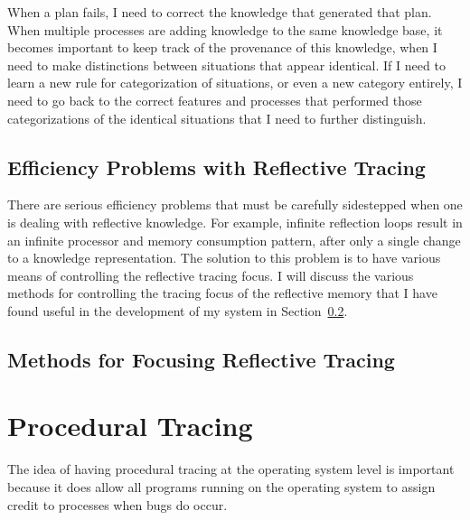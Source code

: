 When a plan fails, I need to correct the knowledge that generated that
plan.  When multiple processes are adding knowledge to the same
knowledge base, it becomes important to keep track of the provenance of
this knowledge, when I need to make distinctions between situations
that appear identical.  If I need to learn a new rule for
categorization of situations, or even a new category entirely, I need
to go back to the correct features and processes that performed those
categorizations of the identical situations that I need to further
distinguish.

\subsection{Efficiency Problems with Reflective Tracing}
\label{sec:reflective_tracing}

There are serious efficiency problems that must be carefully
sidestepped when one is dealing with reflective knowledge.  For
example, infinite reflection loops result in an infinite processor and
memory consumption pattern, after only a single change to a knowledge
representation.  The solution to this problem is to have various means
of controlling the reflective tracing focus.  I will discuss the
various methods for controlling the tracing focus of the reflective
memory that I have found useful in the development of my system in
Section~\ref{sec:methods_for_focusing_reflective_tracing}.


\subsection{Methods for Focusing Reflective Tracing}
\label{sec:methods_for_focusing_reflective_tracing}


\section{Procedural Tracing}

The idea of having procedural tracing at the operating system level is
important because it does allow all programs running on the operating
system to assign credit to processes when bugs do occur.


